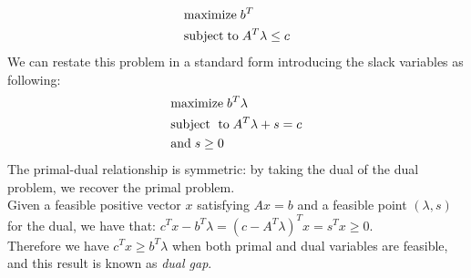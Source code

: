 \documentclass[a4paper,10 pt,titlepage,twoside]{book}
\theoremstyle{plain}
\theoremstyle{definition}
\theoremstyle{remark}
\begin{document}
\begin{equation}
\begin{split}
&\text{maximize\;} b^{T}\\
&\text{subject\;to\;}A^{T}\lambda \leq c
\end{split}
\end{equation} 
We can restate this problem in a standard form introducing the slack variables as following:
\begin{equation}
\begin{split}
&\text{maximize\;}b^{T}\lambda\\
&\text{subject\; to\;}A^{T}\lambda+s=c\\ &\text{and\;} s\geq0
\end{split}
\end{equation} 
The primal-dual relationship is symmetric: by taking the dual of the dual problem, we recover the primal problem. \\
Given a feasible positive vector $x$ satisfying $Ax=b$ and a feasible point $\left(\lambda,s\right)$ for the dual, we have that: $c^{T}x-b^{T}\lambda=\left(c-A^{T}\lambda\right)^{T}x=s^{T}x \geq0$.\\
Therefore we have $c^{T}x\geq b^{T}\lambda$ when both primal and dual variables are feasible, and this result is known as \textit{dual gap}.\\
\end{document}

